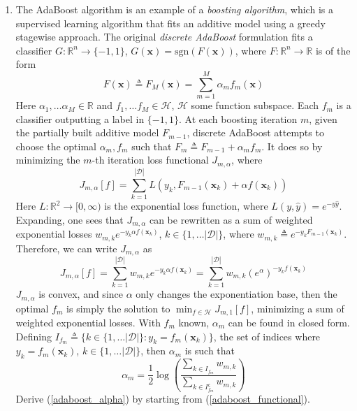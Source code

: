 \documentclass{article}
\numberwithin{equation}{section}
\begin{document}
\begin{enumerate}
    \item
    The AdaBoost\footnotemark{} algorithm is an example of a \textit{boosting algorithm}, which is a
    supervised learning algorithm that fits an additive model using a greedy
    stagewise approach. The original \textit{discrete AdaBoost} formulation fits
    a classifier $ G : \mathbb{R}^n \rightarrow \{-1, 1\} $,
    $ G(\mathbf{x}) = \mathrm{sgn}(F(\mathbf{x})) $, where
    $ F : \mathbb{R}^n \rightarrow \mathbb{R} $ is of the form
    \begin{equation*}
        F(\mathbf{x}) \triangleq F_M(\mathbf{x}) =
        \sum_{m = 1}^M\alpha_mf_m(\mathbf{x})
    \end{equation*}
    Here $ \alpha_1, \ldots \alpha_M \in \mathbb{R} $ and
    $ f_1, \ldots f_M \in \mathcal{H} $, $ \mathcal{H} $ some function subspace.
    Each $ f_m $ is a classifier outputting a label in $ \{-1, 1\} $. At each
    boosting iteration $ m $, given the partially built additive model
    $ F_{m - 1} $, discrete AdaBoost attempts to choose the optimal
    $ \alpha_m, f_m $ such that $ F_m \triangleq F_{m - 1} + \alpha_mf_m $. It
    does so by minimizing the $ m $-th iteration loss functional
    $ J_{m, \alpha} $, where
    \begin{equation*}
        J_{m, \alpha}[f] = \sum_{k = 1}^{|\mathcal{D}|}
        L(y_k, F_{m - 1}(\mathbf{x}_k) + \alpha f(\mathbf{x}_k))
    \end{equation*}
    Here $ L : \mathbb{R}^2 \rightarrow [0, \infty) $ is the exponential loss
    function, where $ L(y, \hat{y}) = e^{-y\hat{y}} $. Expanding, one sees that
    $ J_{m ,\alpha} $ can be rewritten as a sum of weighted exponential
    losses $ w_{m, k}e^{-y_k\alpha f(\mathbf{x}_k)} $,
    $ k \in \{1, \ldots |\mathcal{D}|\} $, where $ w_{m, k} \triangleq
    e^{-y_kF_{m - 1}(\mathbf{x}_k)} $. Therefore, we can write $ J_{m, \alpha} $
    as
    \begin{equation} \label{adaboost_functional}
        J_{m, \alpha}[f] = \sum_{k = 1}^{|\mathcal{D}|}w_{m, k}
        e^{-y_k\alpha f(\mathbf{x}_k)} =
        \sum_{k = 1}^{|\mathcal{D}|}w_{m, k}(e^\alpha)^{-y_kf(\mathbf{x}_k)}
    \end{equation}
    $ J_{m, \alpha} $ is convex, and since $ \alpha $ only changes the
    exponentiation base, then the optimal $ f_m $ is simply the solution to
    $ \min_{f \in \mathcal{H}}J_{m, 1}[f] $, minimizing a sum of weighted
    exponential losses. With $ f_m $ known, $ \alpha_m $ can be found in closed
    form. Defining
    $ I_{f_m} \triangleq \{k \in \{1, \ldots |\mathcal{D}|\} :
    y_k = f_m(\mathbf{x}_k)\} $, the set of indices where
    $ y_k = f_m(\mathbf{x}_k) $, $ k \in \{1, \ldots |\mathcal{D}|\} $, then
    $ \alpha_m $ is such that
    \begin{equation} \label{adaboost_alpha}
        \alpha_m = \frac{1}{2}\log\left(
            \frac{\sum_{k \in I_{f_m}}w_{m, k}}{
                \sum_{k \in I_{f_m}^\mathsf{c}}w_{m, k}
            }
        \right)
    \end{equation}
    Derive (\ref{adaboost_alpha}) by starting from (\ref{adaboost_functional}).


\end{enumerate}
\end{document}
